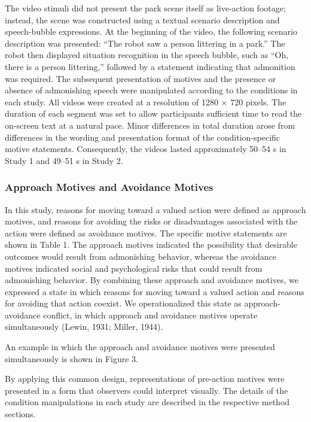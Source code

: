 \documentclass[
]{article}
\begin{document}
The video stimuli did not present the park scene itself as live-action
footage; instead, the scene was constructed using a textual scenario
description and speech-bubble expressions. At the beginning of the
video, the following scenario description was presented: ``The robot saw
a person littering in a park.'' The robot then displayed situation
recognition in the speech bubble, such as ``Oh, there is a person
littering,'' followed by a statement indicating that admonition was
required. The subsequent presentation of motives and the presence or
absence of admonishing speech were manipulated according to the
conditions in each study. All videos were created at a resolution of
1280 × 720 pixels. The duration of each segment was set to allow
participants sufficient time to read the on-screen text at a natural
pace. Minor differences in total duration arose from differences in the
wording and presentation format of the condition-specific motive
statements. Consequently, the videos lasted approximately 50--54 s in
Study 1 and 49--51 s in Study 2.

\subsubsection{Approach Motives and Avoidance
Motives}\label{approach-motives-and-avoidance-motives}

In this study, reasons for moving toward a valued action were defined as
approach motives, and reasons for avoiding the risks or disadvantages
associated with the action were defined as avoidance motives. The
specific motive statements are shown in Table 1. The approach motives
indicated the possibility that desirable outcomes would result from
admonishing behavior, whereas the avoidance motives indicated social and
psychological risks that could result from admonishing behavior. By
combining these approach and avoidance motives, we expressed a state in
which reasons for moving toward a valued action and reasons for avoiding
that action coexist. We operationalized this state as approach-avoidance
conflict, in which approach and avoidance motives operate simultaneously
(Lewin, 1931; Miller, 1944).

An example in which the approach and avoidance motives were presented
simultaneously is shown in Figure 3.

By applying this common design, representations of pre-action motives
were presented in a form that observers could interpret visually. The
details of the condition manipulations in each study are described in
the respective method sections.
\end{document}
